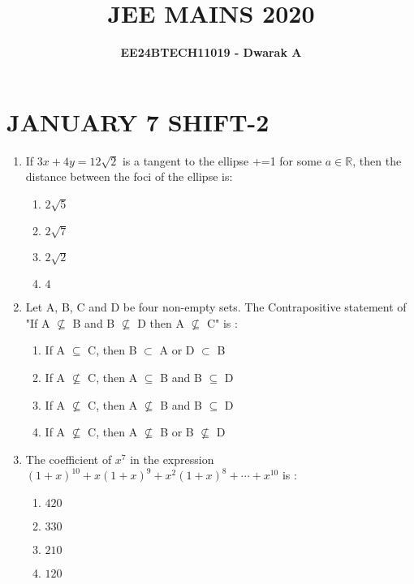 \documentclass[journal,12pt,twocolumn]{IEEEtran}
\theoremstyle{remark}
\begin{document}

\vspace{3cm}

\title{\textbf{JEE MAINS 2020}}
\author{\textbf{EE24BTECH11019 - Dwarak A}}
\maketitle
\newpage
\bigskip

\renewcommand{\thefigure}{\theenumi}
\renewcommand{\thetable}{\theenumi}

\section*{\textbf{JANUARY 7 SHIFT-2}}
\bigskip

\begin{enumerate}

    \item If $3x+4y=12\sqrt{2}$ is a tangent to the ellipse +=1 for some $a\in\mathbb{R}$, then the distance between the foci of the ellipse is:
        \begin{enumerate}
            \item $2\sqrt{5}$
            \item $2\sqrt{7}$
            \item $2\sqrt{2}$
            \item $4$
        \end{enumerate}

    \item Let A, B, C and D be four non-empty sets. The Contrapositive statement of "If A $\nsubseteq$ B and B $\nsubseteq$ D then A $\nsubseteq$ C" is :
        \begin{enumerate}
            \item If A $\subseteq$ C, then B $\subset$ A or D $\subset$ B
            \item If A $\nsubseteq$ C, then A $\subseteq$ B and B $\subseteq$ D
            \item If A $\nsubseteq$ C, then A $\nsubseteq$ B and B $\subseteq$ D
            \item If A $\nsubseteq$ C, then A $\nsubseteq$ B or B $\nsubseteq$ D
        \end{enumerate}
    
    \item The coefficient of $x^7$ in the expression $(1 + x)^{10} + x(1 + x)^9 + x^2(1 + x)^8 +\cdots+x^{10}$ is :
        \begin{enumerate}
            \item $420$
            \item $330$
            \item $210$
            \item $120$
        \end{enumerate}


\end{enumerate}
\end{document}
